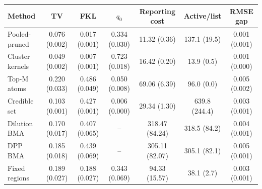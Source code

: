 \begin{tabular}{lcccccc}
\toprule
Method & TV & FKL & $q_0$ & Reporting cost & Active/list & RMSE gap \\
\midrule
Pooled-pruned & 0.076 (0.002) & 0.017 (0.001) & 0.334 (0.030) & 11.32 (0.36) & 137.1 (19.5) & 0.001 (0.001) \\
Cluster kernels & 0.049 (0.002) & 0.007 (0.001) & 0.723 (0.018) & 16.42 (0.20) & 13.9 (0.5) & 0.001 (0.000) \\
Top-M atoms & 0.220 (0.033) & 0.486 (0.049) & 0.050 (0.008) & 69.06 (6.39) & 96.0 (0.0) & 0.005 (0.002) \\
Credible set & 0.103 (0.001) & 0.427 (0.001) & 0.006 (0.000) & 29.34 (1.30) & 639.8 (244.4) & 0.003 (0.001) \\
Dilution BMA & 0.170 (0.017) & 0.407 (0.065) & -- & 318.47 (84.24) & 318.5 (84.2) & 0.004 (0.001) \\
DPP BMA & 0.185 (0.018) & 0.439 (0.069) & -- & 305.11 (82.07) & 305.1 (82.1) & 0.005 (0.001) \\
Fixed regions & 0.189 (0.027) & 0.188 (0.027) & 0.343 (0.069) & 94.33 (15.57) & 38.1 (2.7) & 0.003 (0.001) \\
\bottomrule
\end{tabular}
